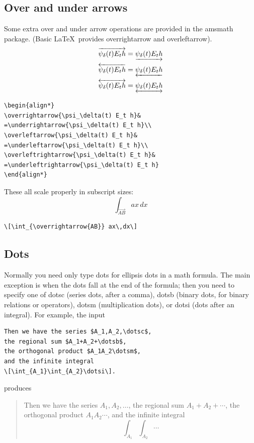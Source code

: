 \documentclass{article}
\newcommand{\ntt}{\normalfont\ttfamily}
\newcommand{\cn}[1]{{\protect\ntt\bslash#1}}
\newcommand{\pkg}[1]{{\protect\ntt#1}}
\theoremstyle{definition}
\theoremstyle{remark}
\begin{document}
\subsection{Over and under arrows}

Some extra over and under arrow operations are provided in
the \pkg{amsmath} package.  (Basic \LaTeX\ provides
\cn{overrightarrow} and \cn{overleftarrow}).
\begin{align*}
\overrightarrow{\psi_\delta(t) E_t h}&
=\underrightarrow{\psi_\delta(t) E_t h}\\
\overleftarrow{\psi_\delta(t) E_t h}&
=\underleftarrow{\psi_\delta(t) E_t h}\\
\overleftrightarrow{\psi_\delta(t) E_t h}&
=\underleftrightarrow{\psi_\delta(t) E_t h}
\end{align*}
\begin{verbatim}
\begin{align*}
\overrightarrow{\psi_\delta(t) E_t h}&
=\underrightarrow{\psi_\delta(t) E_t h}\\
\overleftarrow{\psi_\delta(t) E_t h}&
=\underleftarrow{\psi_\delta(t) E_t h}\\
\overleftrightarrow{\psi_\delta(t) E_t h}&
=\underleftrightarrow{\psi_\delta(t) E_t h}
\end{align*}
\end{verbatim}
These all scale properly in subscript sizes:
\[\int_{\overrightarrow{AB}} ax\,dx\]
\begin{verbatim}
\[\int_{\overrightarrow{AB}} ax\,dx\]
\end{verbatim}

\subsection{Dots}

Normally you need only type \cn{dots} for ellipsis dots in a
math formula.  The main exception is when the dots
fall at the end of the formula; then you need to
specify one of \cn{dotsc} (series dots, after a comma),
\cn{dotsb} (binary dots, for binary relations or operators),
\cn{dotsm} (multiplication dots), or \cn{dotsi} (dots after
an integral).  For example, the input
\begin{verbatim}
Then we have the series $A_1,A_2,\dotsc$,
the regional sum $A_1+A_2+\dotsb$,
the orthogonal product $A_1A_2\dotsm$,
and the infinite integral
\[\int_{A_1}\int_{A_2}\dotsi\].
\end{verbatim}
produces
\begin{quotation}
Then we have the series $A_1,A_2,\dotsc$,
the regional sum $A_1+A_2+\dotsb$,
the orthogonal product $A_1A_2\dotsm$,
and the infinite integral
\[\int_{A_1}\int_{A_2}\dotsi\]
\end{quotation}
\end{document}
